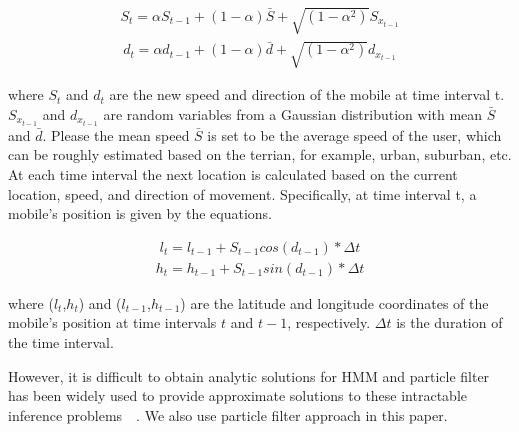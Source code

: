 \documentclass[conference, 10pt]{IEEEtran}
\begin{document}
\begin{NoHyper}
\begin{align}
S_t = \alpha S_{t-1}+(1-\alpha)\bar{S}+\sqrt{(1-\alpha^2)}S_{x_{t-1}}
\label{eqn:speed}
\end{align}
\begin{align}
d_t = \alpha d_{t-1}+(1-\alpha)\bar{d}+\sqrt{(1-\alpha^2)}d_{x_{t-1}}
\label{eqn:speed}
\end{align}

 where $S_t$ and $d_t$ are the new speed and direction of the mobile at time interval t. $S_{x_{t-1}}$ and $d_{x_{t-1}}$
 are random variables from a Gaussian distribution with mean $\bar{S}$ and $\bar{d}$.
 Please the mean speed $\bar{S}$ is set to be the average speed of the user, which can be roughly estimated based on the terrian, for example, urban, suburban, etc.
 At each time interval the next location is calculated based on the current location, speed, and direction of movement.
Specifically, at time interval t, a mobile's position is given by the equations.

\begin{align}
	l_t = l_{t-1} +S_{t-1}cos(d_{t-1})*\Delta t
\label{eqn:mobilitymodelx}
\end{align}
\begin{align}
h_t = h_{t-1} +S_{t-1}sin(d_{t-1})*\Delta t
\label{eqn:mobilitymodely}
\end{align}

where ($l_t$,$h_t$) and ($l_{t-1}$,$h_{t-1}$) are the latitude and longitude coordinates of the mobile’s position 
at time intervals $t$ and $t-1$, respectively. $\Delta t$ is the duration of the time interval.

However, it is difficult to obtain analytic solutions for HMM and particle filter has been widely used to provide approximate solutions to these intractable inference problems~\cite{doucet2009tutorial}~\cite{ThrunParticleFilter}.
We also use particle filter approach in this paper. 


\end{NoHyper}
\end{document}
